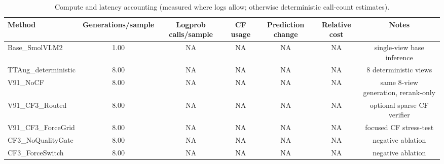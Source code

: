 \begin{table}[t]
\centering
\begin{tabular}{lcccccc}
\toprule
Method & Generations/sample & Logprob calls/sample & CF usage & Prediction change & Relative cost & Notes \\
\midrule
Base_SmolVLM2 & 1.00 & NA & NA & NA & NA & single-view base inference \\
TTAug_deterministic & 8.00 & NA & NA & NA & NA & 8 deterministic views \\
V91_NoCF & 8.00 & NA & NA & NA & NA & same 8-view generation, rerank-only \\
V91_CF3_Routed & 8.00 & NA & NA & NA & NA & optional sparse CF verifier \\
V91_CF3_ForceGrid & 8.00 & NA & NA & NA & NA & focused CF stress-test \\
CF3_NoQualityGate & 8.00 & NA & NA & NA & NA & negative ablation \\
CF3_ForceSwitch & 8.00 & NA & NA & NA & NA & negative ablation \\
\bottomrule
\end{tabular}
\caption{Compute and latency accounting (measured where logs allow; otherwise deterministic call-count estimates).}
\label{tab:compute_cost}
\end{table}
